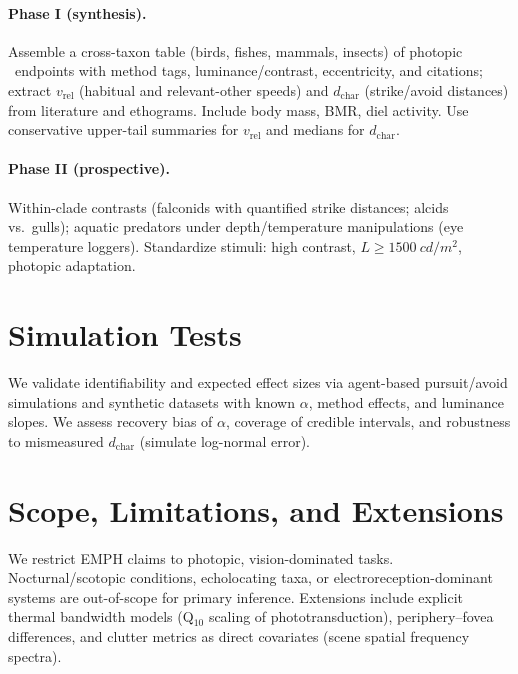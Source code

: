\documentclass[11pt]{article}
\newcommand{\cff}{\mathrm{CFF}}               %
\newcommand{\vrel}{v_{\mathrm{rel}}}          %
\newcommand{\dchar}{d_{\mathrm{char}}}        %
\newcommand{\Lumin}{L}                        %
\begin{document}
\paragraph{Phase I (synthesis).} Assemble a cross-taxon table (birds, fishes, mammals, insects) of photopic \cff\ endpoints with method tags, luminance/contrast, eccentricity, and citations; extract $\vrel$ (habitual and relevant-other speeds) and $\dchar$ (strike/avoid distances) from literature and ethograms. Include body mass, BMR, diel activity. Use conservative upper-tail summaries for $\vrel$ and medians for $\dchar$.

\paragraph{Phase II (prospective).} Within-clade contrasts (falconids with quantified strike distances; alcids vs.\ gulls); aquatic predators under depth/temperature manipulations (eye temperature loggers). Standardize stimuli: high contrast, $\Lumin \ge \SI{1500}{cd/m^2}$, photopic adaptation.

\section{Simulation Tests}
We validate identifiability and expected effect sizes via agent-based pursuit/avoid simulations and synthetic datasets with known $\alpha$, method effects, and luminance slopes. We assess recovery bias of $\alpha$, coverage of credible intervals, and robustness to mismeasured $\dchar$ (simulate log-normal error).

\section{Scope, Limitations, and Extensions}
We restrict EMPH claims to photopic, vision-dominated tasks. Nocturnal/scotopic conditions, echolocating taxa, or electroreception-dominant systems are out-of-scope for primary inference. Extensions include explicit thermal bandwidth models (Q$_{10}$ scaling of phototransduction), periphery--fovea differences, and clutter metrics as direct covariates (scene spatial frequency spectra).
\end{document}
